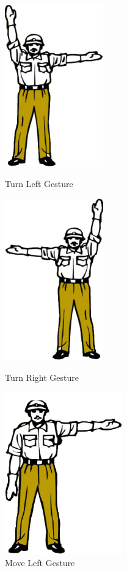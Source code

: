 \begin{figure}
	\centering 
	\begin{minipage}
		{.45 
		\textwidth} \centering 
		\includegraphics[height=7cm]{figures/content/ges-turn-left.jpg} \caption{Turn Left Gesture} \label{fg:ges:2} 
	\end{minipage}
	\begin{minipage}
		{.45 
		\textwidth} \centering 
		\includegraphics[height=7cm]{figures/content/ges-turn-right.jpg} \caption{Turn Right Gesture} \label{fg:ges:3} 
	\end{minipage}
	\begin{minipage}
		{.45 
		\textwidth} \centering 
		\includegraphics[height=7cm]{figures/content/ges-move-left.jpg} \caption{Move Left Gesture} \label{fg:ges:4} 

\end{minipage}
\end{figure}
